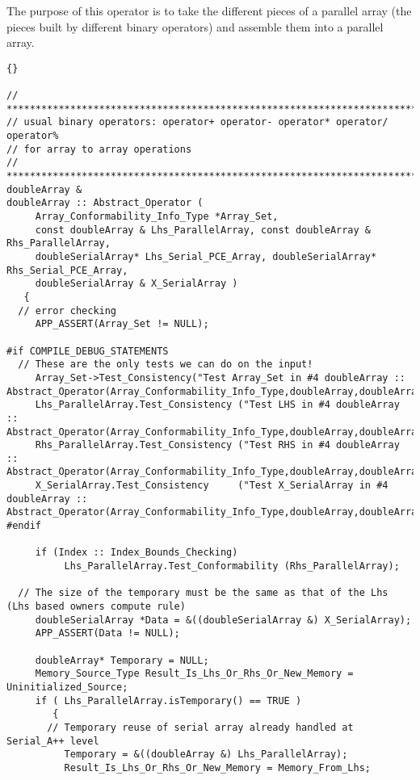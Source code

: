 \documentclass[10pt]{llncs}
\begin{document}
   The purpose of this operator is to take the different pieces of a parallel array
(the pieces built by different binary operators) and assemble them into a parallel array.

\vspace{0.5in}

\begin{lstlisting}{}

// ************************************************************************
// usual binary operators: operator+ operator- operator* operator/ operator% 
// for array to array operations
// ************************************************************************
doubleArray &
doubleArray :: Abstract_Operator (
     Array_Conformability_Info_Type *Array_Set, 
     const doubleArray & Lhs_ParallelArray, const doubleArray & Rhs_ParallelArray, 
     doubleSerialArray* Lhs_Serial_PCE_Array, doubleSerialArray* Rhs_Serial_PCE_Array, 
     doubleSerialArray & X_SerialArray )
   {
  // error checking
     APP_ASSERT(Array_Set != NULL);

#if COMPILE_DEBUG_STATEMENTS
  // These are the only tests we can do on the input!
     Array_Set->Test_Consistency("Test Array_Set in #4 doubleArray :: Abstract_Operator(Array_Conformability_Info_Type,doubleArray,doubleArray,doubleSerialArray)");
     Lhs_ParallelArray.Test_Consistency ("Test LHS in #4 doubleArray :: Abstract_Operator(Array_Conformability_Info_Type,doubleArray,doubleArray,doubleSerialArray)");
     Rhs_ParallelArray.Test_Consistency ("Test RHS in #4 doubleArray :: Abstract_Operator(Array_Conformability_Info_Type,doubleArray,doubleArray,doubleSerialArray)");
     X_SerialArray.Test_Consistency     ("Test X_SerialArray in #4 doubleArray :: Abstract_Operator(Array_Conformability_Info_Type,doubleArray,doubleArray,doubleSerialArray)");
#endif

     if (Index :: Index_Bounds_Checking)
          Lhs_ParallelArray.Test_Conformability (Rhs_ParallelArray);

  // The size of the temporary must be the same as that of the Lhs (Lhs based owners compute rule)
     doubleSerialArray *Data = &((doubleSerialArray &) X_SerialArray);
     APP_ASSERT(Data != NULL);

     doubleArray* Temporary = NULL;
     Memory_Source_Type Result_Is_Lhs_Or_Rhs_Or_New_Memory = Uninitialized_Source;
     if ( Lhs_ParallelArray.isTemporary() == TRUE )
        {
       // Temporary reuse of serial array already handled at Serial_A++ level
          Temporary = &((doubleArray &) Lhs_ParallelArray);
          Result_Is_Lhs_Or_Rhs_Or_New_Memory = Memory_From_Lhs;


\end{lstlisting}
\end{document}

